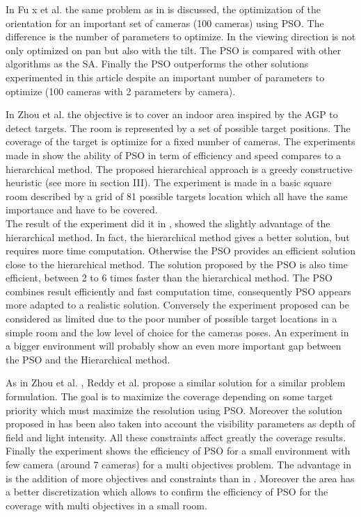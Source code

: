 In Fu x et al. \cite{194*fu2010} the same problem as in \cite{84*xu2011} is discussed, the optimization of the orientation for an important set of cameras (100 cameras) using PSO. The difference is the number of parameters to optimize. In \cite{194*fu2010} the viewing direction is not only optimized on pan but also with the tilt.  
The PSO is compared with other algorithms as the SA. Finally the PSO outperforms the other solutions experimented in this article despite an important number of parameters to optimize (100 cameras with 2 parameters by camera).

In Zhou et al. \cite{8*zhou2011} the objective is to cover an indoor area inspired by the AGP to detect targets. The room is represented by a set of possible target positions. The coverage of the target is optimize for a fixed number of cameras. 
 The experiments made in \cite{8*zhou2011} show the ability of PSO in term of efficiency and speed compares to a hierarchical method. The proposed hierarchical approach is a greedy constructive heuristic (see more in \cite{8*zhou2011} section III). The experiment is made in a basic square room described by a grid of 81 possible targets location which all have the same importance and have to be covered. \\
The result of the experiment did it in \cite{8*zhou2011}, showed the slightly advantage of the hierarchical method. In fact, the hierarchical method gives a better solution, but requires more time computation.
Otherwise the PSO provides an efficient solution close to the hierarchical method. The solution proposed by the PSO is also time efficient, between 2 to 6 times faster than the hierarchical method.  The PSO combines result efficiently and fast computation time, consequently PSO appears more adapted to a realistic solution. Conversely the experiment proposed can be considered as limited due to the  poor number of possible target locations in a simple room and the low level of choice for the cameras poses. 
An experiment in a bigger environment will probably show an even more important gap between the PSO and the Hierarchical method.

As in Zhou et al. \cite{8*zhou2011}, Reddy et al. \cite{33*reddy2012} propose a similar solution for a similar problem formulation. The goal is to maximize the coverage depending on some target priority which must maximize the resolution using PSO.
Moreover the solution proposed in \cite{33*reddy2012} has been also taken into account the visibility parameters as depth of field and light intensity. All these constraints affect greatly the coverage results. Finally the experiment shows the efficiency of PSO for a small environment with few camera (around 7 cameras) for a multi objectives problem. The advantage in \cite{33*reddy2012} is the addition of more objectives and constraints than in \cite{8*zhou2011}. Moreover the area has a better discretization which allows to confirm the efficiency of PSO for the coverage with multi objectives in a small room.

